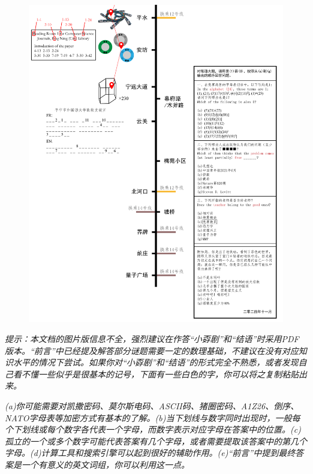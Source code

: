 \documentclass[11pt,a4paper,onecolumn,UTF8]{ctexart}
\begin{document}
	\begin{figure}[!h]
	\centering
	\includegraphics[width=0.99\columnwidth]{11B.png}
	\end{figure}
	
	\newpage
	
	\textit{提示：本文档的图片版信息不全，强烈建议在作答“小孬剧”和“结语”时采用PDF版本。“前言”中已经提及解答部分谜题需要一定的数理基础，不建议在没有对应知识水平的情况下尝试。如果你对“小孬剧”和“结语”的形式完全不熟悉，或者发现自己看不懂一些似乎是很基本的记号，下面有一些白色的字，你可以将之复制粘贴出来。}
		
	\footnotesize{\color{white}\textit{(a)你可能需要对凯撒密码、莫尔斯电码、ASCII码、猪圈密码、A1Z26、倒序、NATO字母表等加密方式有基本的了解。(b)当下划线与数字同时出现时，一般每个下划线或每个数字各代表一个字母，而数字表示对应字母在答案中的位置。(c)孤立的一个或多个数字可能代表答案有几个字母，或者需要提取该答案中的第几个字母。(d)计算工具和搜索引擎可以起到很好的辅助作用。(e)“前言”中提到最终答案是一个有意义的英文词组，你可以利用这一点。}}
	
	
	
	
	
	
	
\end{document}
